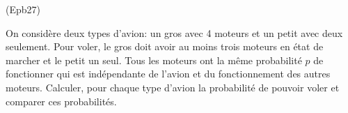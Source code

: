 \begin{tiny}(Epb27)\end{tiny} On considère deux types d'avion: un gros avec 4 moteurs et un petit avec deux seulement. Pour voler, le gros doit avoir au moins trois moteurs en état de marcher et le petit un seul. Tous les moteurs ont la même probabilité $p$ de fonctionner qui est indépendante de l'avion et du fonctionnement des autres moteurs. Calculer, pour chaque type d'avion la probabilité de pouvoir voler et comparer ces probabilités.   